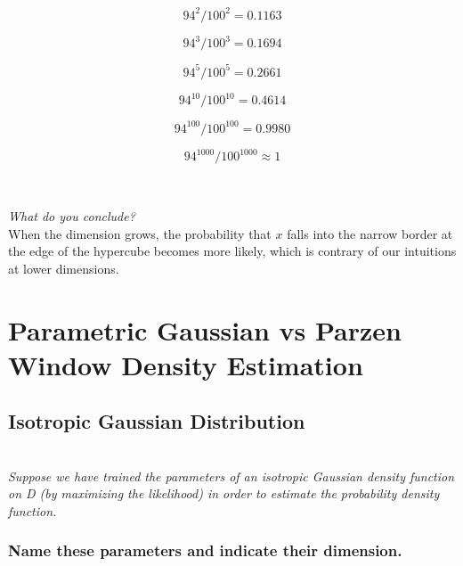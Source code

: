 \documentclass{amsart}
\theoremstyle{definition}
\theoremstyle{remark}
\numberwithin{equation}{section}
\begin{document}
\begin{equation}
    94^2 / 100^2 = 0.1163
\end{equation}

\begin{equation}
    94^3 / 100^3 = 0.1694
\end{equation}

\begin{equation}
    94^5 / 100^5 = 0.2661
\end{equation}

\begin{equation}
    94^{10} / 100^{10} = 0.4614
\end{equation}

\begin{equation}
    94^{100} / 100^{100} = 0.9980
\end{equation}

\begin{equation}
    94^{1000} / 100^{1000} \approx 1
\end{equation} \\

\subsection{} 

\textit{What do you conclude?} \\

When the dimension grows, the probability that $x$ falls into the narrow 
border at the edge of the hypercube becomes more likely, which is contrary of 
our intuitions at lower dimensions. 

\section{Parametric Gaussian vs Parzen Window Density Estimation}

\subsection{Isotropic Gaussian Distribution} \\

\textit{Suppose we have trained the parameters of an isotropic Gaussian density 
function on D (by maximizing the likelihood) in order to estimate the 
probability density function.} \\

\subsubsection{Name these parameters and indicate their dimension.} 
\end{document}

